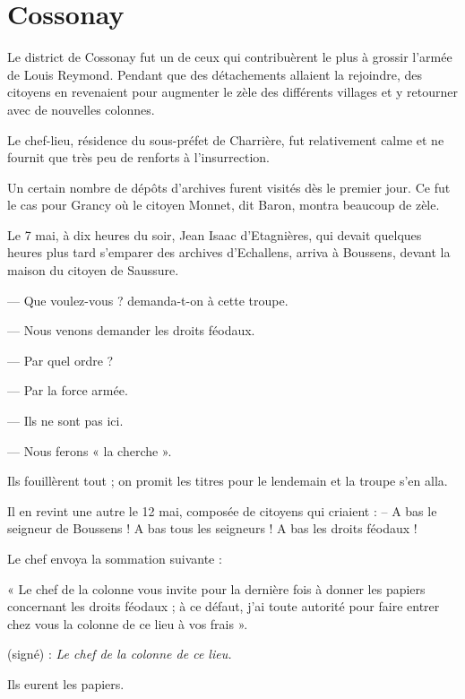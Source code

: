 \documentclass[french,twoside]{book} %
\newenvironment{quoteblock}%
  {\begin{quoting}}
  {\end{quoting}}
\newenvironment{quotebar}{%
    \def\FrameCommand{{\color{rubric!10!}\vrule width 0.5em} \hspace{0.9em}}%
    \def\OuterFrameSep{\itemsep} %
    \MakeFramed {\advance\hsize-\width \FrameRestore}
  }%
  {%
    \endMakeFramed
  }
\renewenvironment{quoteblock}%
  {%
    \savenotes
    \setstretch{0.9}
    \begin{quotebar}
  }
  {%
    \end{quotebar}
    \spewnotes
  }
\begin{document}
\section[Cossonay]{Cossonay}
\noindent Le district de Cossonay fut un de ceux qui contribuèrent le plus à grossir l’armée de Louis Reymond. Pendant que des détachements allaient la rejoindre, des citoyens en revenaient pour augmenter le zèle des différents villages et y retourner avec de nouvelles colonnes.\par
Le chef-lieu, résidence du sous-préfet de Charrière, fut relativement calme et ne fournit que très peu de renforts à l’insurrection.\par
Un certain nombre de dépôts d’archives furent visités dès le premier jour. Ce fut le cas pour Grancy où le citoyen Monnet, dit Baron, montra beaucoup de zèle.\par
Le 7 mai, à dix heures du soir, Jean Isaac d’Etagnières, qui devait quelques heures plus tard s’emparer des archives d’Echallens, arriva à Boussens, devant la maison du citoyen de Saussure.\par
— Que voulez-vous ? demanda-t-on à cette troupe.\par
— Nous venons demander les droits féodaux.\par
— Par quel ordre ?\par
— Par la force armée.\par
— Ils ne sont pas ici.\par
— Nous ferons « la cherche ».\par
Ils fouillèrent tout ; on promit les titres pour le lendemain et la troupe s’en alla.\par
Il en revint une autre le 12 mai, composée de citoyens qui criaient : – A bas le seigneur de Boussens ! A bas tous les seigneurs ! A bas les droits féodaux !\par
Le chef envoya la sommation suivante :\par

\begin{quoteblock}
 \noindent « Le chef de la colonne vous invite pour la dernière fois à donner les papiers concernant les droits féodaux ; à ce défaut, j’ai toute autorité pour faire entrer chez vous la colonne de ce lieu à vos frais ».\par
 (signé) : \emph{Le chef de la colonne de ce lieu.}
 \end{quoteblock}

\noindent Ils eurent les papiers.\par
\end{document}
